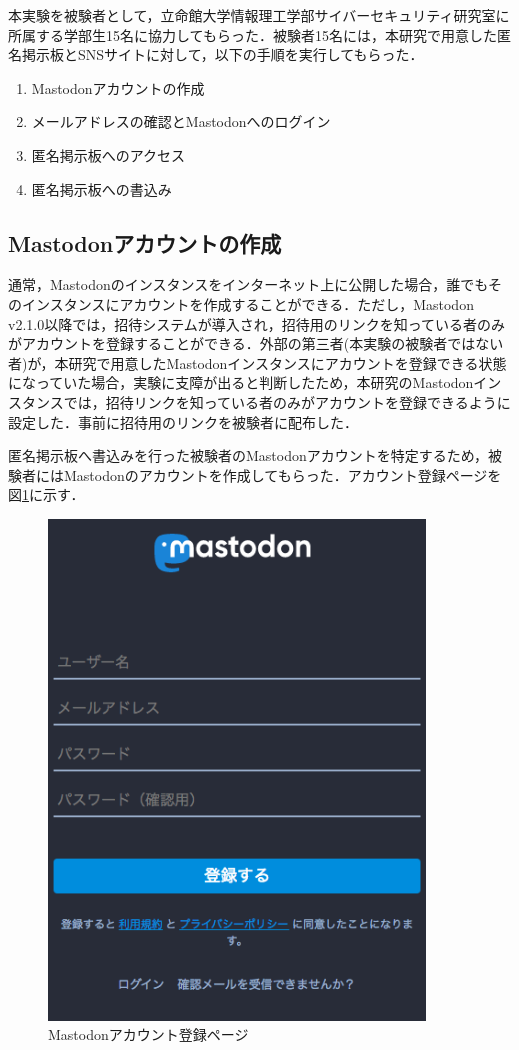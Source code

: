 \documentclass[10pt, a4paper]{jreport}
\begin{document}
本実験を被験者として，立命館大学情報理工学部サイバーセキュリティ研究室に所属する学部生15名に協力してもらった．被験者15名には，本研究で用意した匿名掲示板とSNSサイトに対して，以下の手順を実行してもらった．

\begin{enumerate}
\item{Mastodonアカウントの作成}
\item{メールアドレスの確認とMastodonへのログイン}
\item{匿名掲示板へのアクセス}
\item{匿名掲示板への書込み}
\end{enumerate}

\subsection{Mastodonアカウントの作成}
通常，Mastodonのインスタンスをインターネット上に公開した場合，誰でもそのインスタンスにアカウントを作成することができる．ただし，Mastodon v2.1.0以降では，招待システムが導入され，招待用のリンクを知っている者のみがアカウントを登録することができる\cite{invite_system}．外部の第三者(本実験の被験者ではない者)が，本研究で用意したMastodonインスタンスにアカウントを登録できる状態になっていた場合，実験に支障が出ると判断したため，本研究のMastodonインスタンスでは，招待リンクを知っている者のみがアカウントを登録できるように設定した．事前に招待用のリンクを被験者に配布した．

匿名掲示板へ書込みを行った被験者のMastodonアカウントを特定するため，被験者にはMastodonのアカウントを作成してもらった．アカウント登録ページを図\ref{fig: account_registration}に示す．

\begin{figure}[H]
	\begin{center}
		\includegraphics[width=100mm]{figures/account_registration_screenshot.png}
	\end{center}
	\caption{Mastodonアカウント登録ページ}
	\label{fig: account_registration}
\end{figure}
\end{document}
